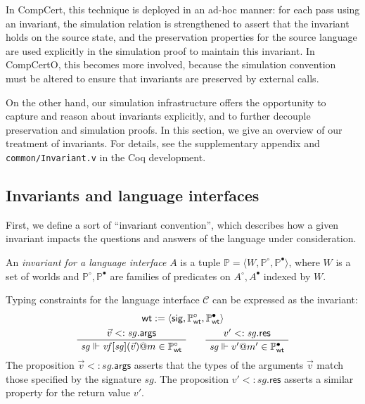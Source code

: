 \documentclass[sigplan,screen]{acmart}
\newcommand{\kw}[1]{\ensuremath{ \mathsf{#1} }}
\newcommand{\que}{\circ}
\newcommand{\ans}{\bullet}
\newenvironment{optional}{}{}
\begin{document}
\begin{optional}
In CompCert,
this technique is deployed in an ad-hoc manner:
for each pass using an invariant,
the simulation relation is strengthened to assert that
the invariant holds on the source state,
and the preservation properties for the source language
are used explicitly in the simulation proof
to maintain this invariant.
In CompCertO,
this becomes more involved,
because the simulation convention must be altered
to ensure that invariants are preserved
by external calls.

On the other hand,
our simulation infrastructure offers the opportunity
to capture and reason about invariants explicitly,
and to further decouple preservation and simulation proofs.
In this section,
we give an overview of our treatment of invariants.
For details,
see the supplementary appendix and
\texttt{common/Invariant.v}
in the Coq development.


\subsection{Invariants and language interfaces} %

First, we define a sort of ``invariant convention'',
which describes how a given invariant impacts the questions and answers
of the language under consideration.

\begin{definition} %
An \emph{invariant for a language interface} $A$
is a tuple
$\mathbb{P} = \langle W, \mathbb{P}^\que, \mathbb{P}^\ans \rangle$,
where $W$ is a set of worlds
and $\mathbb{P}^\que, \mathbb{P}^\ans$
are families of predicates on $A^\que, A^\ans$
indexed by $W$.
\end{definition}

\begin{example} \label{ex:wt} %
Typing constraints for the language interface $\mathcal{C}$
can be expressed as the invariant:
\begin{gather*}
  \kw{wt} :=
    \langle
      \kw{sig},
      \mathbb{P}_\kw{wt}^\que,
      \mathbb{P}_\kw{wt}^\ans
    \rangle
  \\
  \AxiomC{$\vec{v} <: \mathit{sg}.\kw{args}$}
  \UnaryInfC{$\mathit{sg} \Vdash
    \mathit{vf}[\mathit{sg}](\vec{v})@m \in \mathbb{P}_\kw{wt}^\que$}
  \DisplayProof
  \qquad
  \AxiomC{$v' <: \mathit{sg}.\kw{res}$}
  \UnaryInfC{$\mathit{sg} \Vdash
    v'@m' \in \mathbb{P}_\kw{wt}^\ans$}
  \DisplayProof
\end{gather*}
The proposition $\vec{v} <: \mathit{sg}.\kw{args}$
asserts that the types of the arguments $\vec{v}$
match those specified by the signature $\mathit{sg}$.
The proposition $v' <: \mathit{sg}.\kw{res}$
asserts a similar property for the return value $v'$.
\end{example}


\end{optional}
\end{document}
